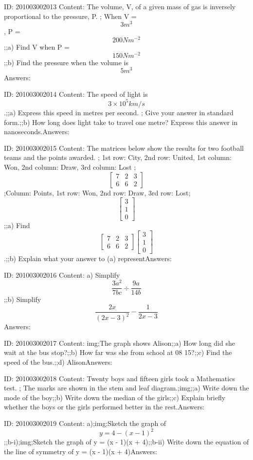 \documentclass{article}
\begin{document}
ID: 201003002013
Content:
The volume, V, of a given mass of gas is inversely proportional to the pressure, P. ; When V = $$3 m^3$$, P = $$200 Nm^{-2}$$;;a) Find V when P = $$150 Nm^{-2}$$;;b) Find the pressure when the volume is $$5 m^3$$Answers:

ID: 201003002014
Content:
The speed of light is $$3 \times 10^5 km/s$$.;;a) Express this speed in metres per second. ; Give your answer in standard form.;;b) How long does light take to travel one metre? Express this answer in nanoseconds.Answers:

ID: 201003002015
Content:
The matrices below show the results for two football teams and the points awarded. ; 1st row: City, 2nd row: United, 1st column: Won, 2nd column: Draw, 3rd column: Lost ; $$\begin{bmatrix}7&2&3\\6&6&2\end{bmatrix}$$ ;Column: Points, 1st row: Won, 2nd row: Draw, 3rd row: Lost; $$\begin{bmatrix}3\\1\\0\end{bmatrix}$$;;a) Find $$\begin{bmatrix}7&2&3\\6&6&2\end{bmatrix} \begin{bmatrix}3\\1\\0\end{bmatrix}$$.;;b) Explain what your answer to (a) representAnswers:

ID: 201003002016
Content:
a) Simplify $$\frac{3a^2}{7bc} \div \frac{9a}{14b}$$;;b) Simplify $$\frac{2x}{(2x - 3)^2} - \frac{1}{2x-3}$$Answers:

ID: 201003002017
Content:
img;The graph shows Alison;;a) How long did she wait at the bus stop?;;b) How far was she from school at 08 15?;;c) Find the speed of the bus.;;d) AlisonAnswers:

ID: 201003002018
Content:
Twenty boys and fifteen girls took a Mathematics test. ; The marks are shown in the stem and leaf diagram.;img;;a) Write down the mode of the boy;;b) Write down the median of the girls;;c) Explain briefly whether the boys or the girls performed better in the rest.Answers:

ID: 201003002019
Content:
a);img;Sketch the graph of $$y = 4 - (x - 1) ^2$$;;b-i);img;Sketch the graph of y = (x - 1)(x + 4);;b-ii) Write down the equation of the line of symmetry of y = (x - 1)(x + 4)Answers:
\end{document}
